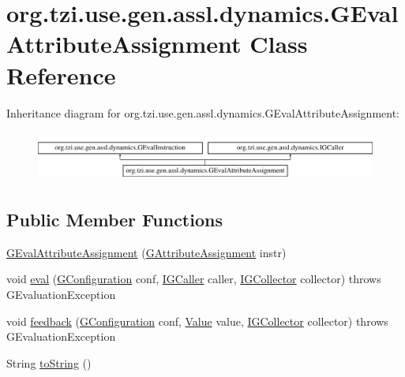 \hypertarget{classorg_1_1tzi_1_1use_1_1gen_1_1assl_1_1dynamics_1_1_g_eval_attribute_assignment}{\section{org.\-tzi.\-use.\-gen.\-assl.\-dynamics.\-G\-Eval\-Attribute\-Assignment Class Reference}
\label{classorg_1_1tzi_1_1use_1_1gen_1_1assl_1_1dynamics_1_1_g_eval_attribute_assignment}
}
Inheritance diagram for org.\-tzi.\-use.\-gen.\-assl.\-dynamics.\-G\-Eval\-Attribute\-Assignment\-:\begin{figure}[H]
\begin{center}
\leavevmode
\includegraphics[height=1.666667cm]{classorg_1_1tzi_1_1use_1_1gen_1_1assl_1_1dynamics_1_1_g_eval_attribute_assignment}
\end{center}
\end{figure}
\subsection*{Public Member Functions}
\begin{DoxyCompactItemize}
\item 
\hyperlink{classorg_1_1tzi_1_1use_1_1gen_1_1assl_1_1dynamics_1_1_g_eval_attribute_assignment_a04beb1bb8a44ccca24bba9b53e2bbcb5}{G\-Eval\-Attribute\-Assignment} (\hyperlink{classorg_1_1tzi_1_1use_1_1gen_1_1assl_1_1statics_1_1_g_attribute_assignment}{G\-Attribute\-Assignment} instr)
\item 
void \hyperlink{classorg_1_1tzi_1_1use_1_1gen_1_1assl_1_1dynamics_1_1_g_eval_attribute_assignment_a5fe7246b1cb3bc9fb67c2e9a6bcabf11}{eval} (\hyperlink{classorg_1_1tzi_1_1use_1_1gen_1_1assl_1_1dynamics_1_1_g_configuration}{G\-Configuration} conf, \hyperlink{interfaceorg_1_1tzi_1_1use_1_1gen_1_1assl_1_1dynamics_1_1_i_g_caller}{I\-G\-Caller} caller, \hyperlink{interfaceorg_1_1tzi_1_1use_1_1gen_1_1assl_1_1dynamics_1_1_i_g_collector}{I\-G\-Collector} collector)  throws G\-Evaluation\-Exception 
\item 
void \hyperlink{classorg_1_1tzi_1_1use_1_1gen_1_1assl_1_1dynamics_1_1_g_eval_attribute_assignment_a551e02c5aad81ef621245a52bbfd2796}{feedback} (\hyperlink{classorg_1_1tzi_1_1use_1_1gen_1_1assl_1_1dynamics_1_1_g_configuration}{G\-Configuration} conf, \hyperlink{classorg_1_1tzi_1_1use_1_1uml_1_1ocl_1_1value_1_1_value}{Value} value, \hyperlink{interfaceorg_1_1tzi_1_1use_1_1gen_1_1assl_1_1dynamics_1_1_i_g_collector}{I\-G\-Collector} collector)  throws G\-Evaluation\-Exception 
\item 
String \hyperlink{classorg_1_1tzi_1_1use_1_1gen_1_1assl_1_1dynamics_1_1_g_eval_attribute_assignment_ac538405e05d046f54e70ecb5e499d78a}{to\-String} ()
\end{DoxyCompactItemize}
